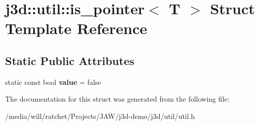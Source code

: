 \hypertarget{structj3d_1_1util_1_1is__pointer}{}\section{j3d\+:\+:util\+:\+:is\+\_\+pointer$<$ T $>$ Struct Template Reference}
\label{structj3d_1_1util_1_1is__pointer}
\subsection*{Static Public Attributes}
\begin{DoxyCompactItemize}
\item 
\hypertarget{structj3d_1_1util_1_1is__pointer_a378ef0f6c020a72f7fef4d410f44e53a}{}static const bool {\bfseries value} = false\label{structj3d_1_1util_1_1is__pointer_a378ef0f6c020a72f7fef4d410f44e53a}

\end{DoxyCompactItemize}


The documentation for this struct was generated from the following file\+:\begin{DoxyCompactItemize}
\item 
/media/will/ratchet/\+Projects/\+J\+A\+W/j3d-\/demo/j3d/util/util.\+h\end{DoxyCompactItemize}
